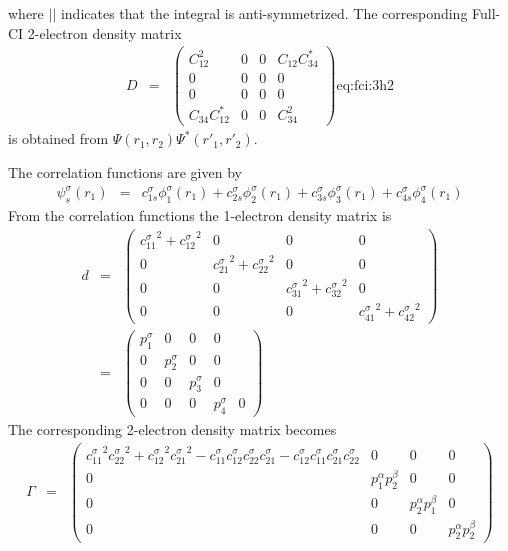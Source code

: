 \documentclass[pra,nofootinbib]{revtex4-1}
\newcommand{\dlabel}[1]{\text{#1}\label{#1}}
\begin{document}
where $||$ indicates that the integral is anti-symmetrized. 
The corresponding Full-CI 2-electron density matrix
\begin{eqnarray}
   D &=& 
   \begin{pmatrix}
   C_{12}^2     & 0 & 0 & C_{12}C^*_{34} \\
   0            & 0 & 0 & 0            \\
   0            & 0 & 0 & 0            \\
   C_{34}C^*_{12} & 0 & 0 & C_{34}^2
   \end{pmatrix}
   \dlabel{eq:fci:3h2}
\end{eqnarray}
is obtained from $\Psi(r_1,r_2)\Psi^*(r'_1,r'_2)$.

The correlation functions are given by
\begin{eqnarray}
   \psi_s^\sigma(r_1)
        &=& c^\sigma_{1s}\phi^\sigma_1(r_1)
         +  c^\sigma_{2s}\phi^\sigma_2(r_1)
         +  c^\sigma_{3s}\phi^\sigma_3(r_1)
         +  c^\sigma_{4s}\phi^\sigma_4(r_1)
\end{eqnarray}
From the correlation functions the 1-electron density matrix is
\begin{eqnarray}
   d &=&
   \begin{pmatrix}
   \left.c_{11}^\sigma\right.^2+\left.c_{12}^\sigma\right.^2 & 0 & 0 & 0 \\
   0 & \left.c_{21}^\sigma\right.^2+\left.c_{22}^\sigma\right.^2 & 0 & 0 \\
   0 & 0 & \left.c_{31}^\sigma\right.^2+\left.c_{32}^\sigma\right.^2 & 0 \\
   0 & 0 & 0 & \left.c_{41}^\sigma\right.^2+\left.c_{42}^\sigma\right.^2 
   \end{pmatrix} \\
   &=&
   \begin{pmatrix}
   p_{1}^\sigma & 0            & 0            & 0                \\
   0            & p_{2}^\sigma & 0            & 0                \\
   0            & 0            & p_{3}^\sigma & 0                \\
   0            & 0            & 0            & p_{4}^\sigma & 0 
   \end{pmatrix}
\end{eqnarray}
The corresponding 2-electron density matrix becomes
\begin{eqnarray}
  \Gamma &=&
  \begin{pmatrix}
  \left.c_{11}^\sigma\right.^2 \left.c_{22}^\sigma\right.^2 + \left.c_{12}^\sigma\right.^2\left.c_{21}^\sigma\right.^2
  -c_{11}^\sigma c_{12}^\sigma c_{22}^\sigma c_{21}^\sigma - c_{12}^\sigma c_{11}^\sigma c_{21}^\sigma c_{22}^\sigma
   & 0 & 0 & 0 \\
  0 & p_{1}^\alpha p_{2}^\beta & 0 & 0 \\
  0 & 0 & p_{2}^\alpha p_{1}^\beta & 0 \\
  0 & 0 & 0 & p_{2}^\alpha p_{2}^\beta
  \end{pmatrix}
\end{eqnarray}
\end{document}
